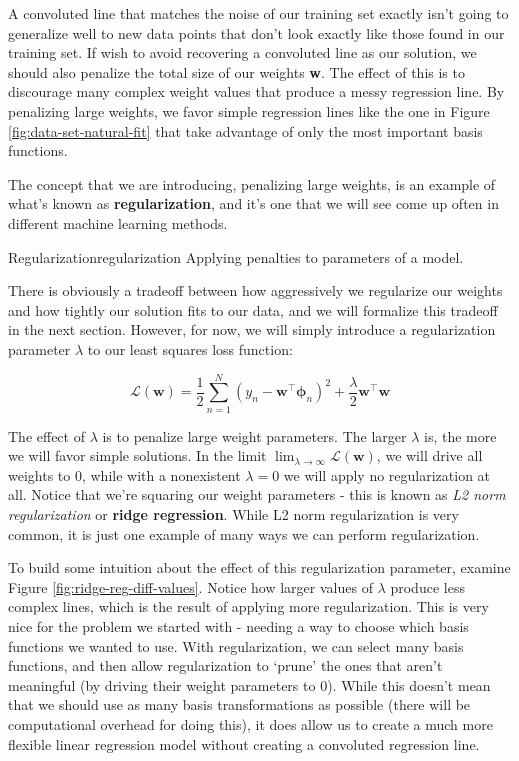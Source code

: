 A convoluted line that matches the noise of our training set exactly isn't going to generalize well to new data points that don't look exactly like those found in our training set. If wish to avoid recovering a convoluted line as our solution, we should also penalize the total size of our weights \textbf{w}. The effect of this is to discourage many complex weight values that produce a messy regression line. By penalizing large weights, we favor simple regression lines like the one in Figure \ref{fig:data-set-natural-fit} that take advantage of only the most important basis functions.

The concept that we are introducing, penalizing large weights, is an example of what's known as \textbf{regularization}, and it's one that we will see come up often in different machine learning methods.

\begin{definition}{Regularization}{regularization}
    Applying penalties to parameters of a model.
\end{definition}

There is obviously a tradeoff between how aggressively we regularize our weights and how tightly our solution fits to our data, and we will formalize this tradeoff in the next section. However, for now, we will simply introduce a regularization parameter $\lambda$ to our least squares loss function:

\begin{equation} \label{least-squares-loss-fn-w-regularization}
    \mathcal{L}(\textbf{w}) = \frac{1}{2} \sum_{n=1}^{N} (y_{n} - \textbf{w}^\top\boldsymbol{\phi}_{n})^2 + \frac{\lambda}{2}\textbf{w}^{\top}\textbf{w}
\end{equation}

The effect of $\lambda$ is to penalize large weight parameters. The larger $\lambda$ is, the more we will favor simple solutions. In the limit $\lim_{\lambda\to\infty} \mathcal{L}(\textbf{w})$, we will drive all weights to 0, while with a nonexistent $\lambda = 0$ we will apply no regularization at all. Notice that we're squaring our weight parameters - this is known as \textit{L2 norm regularization} or \textbf{ridge regression}. While L2 norm regularization is very common, it is just one example of many ways we can perform regularization.

To build some intuition about the effect of this regularization parameter, examine Figure \ref{fig:ridge-reg-diff-values}. Notice how larger values of $\lambda$ produce less complex lines, which is the result of applying more regularization. This is very nice for the problem we started with - needing a way to choose which basis functions we wanted to use. With regularization, we can select many basis functions, and then allow regularization to `prune' the ones that aren't meaningful (by driving their weight parameters to 0). While this doesn't mean that we should use as many basis transformations as possible (there will be computational overhead for doing this), it does allow us to create a much more flexible linear regression model without creating a convoluted regression line.

